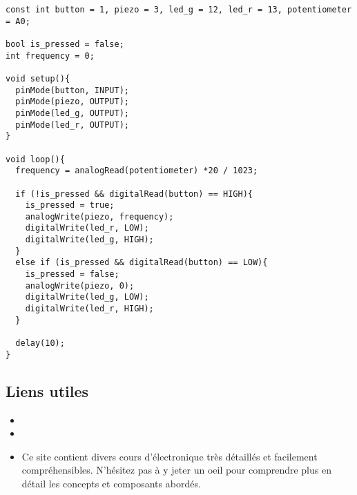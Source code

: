 \begin{tcolorbox}[colback=yellow-atelier!10, colframe=gray!70!black, coltitle=black, colbacktitle=gray!70!white, title={\textit{Bientôt DJ ?}}, leftrule=2mm]
\begin{small}
\begin{verbatim}
const int button = 1, piezo = 3, led_g = 12, led_r = 13, potentiometer = A0;

bool is_pressed = false;
int frequency = 0;

void setup(){
  pinMode(button, INPUT);
  pinMode(piezo, OUTPUT);
  pinMode(led_g, OUTPUT);
  pinMode(led_r, OUTPUT);
}

void loop(){
  frequency = analogRead(potentiometer) *20 / 1023;
  
  if (!is_pressed && digitalRead(button) == HIGH){
    is_pressed = true;
  	analogWrite(piezo, frequency);
    digitalWrite(led_r, LOW);
    digitalWrite(led_g, HIGH);
  }
  else if (is_pressed && digitalRead(button) == LOW){
    is_pressed = false;
  	analogWrite(piezo, 0);
    digitalWrite(led_g, LOW);
    digitalWrite(led_r, HIGH);
  }
  
  delay(10);
}
\end{verbatim}
\end{small}
\end{tcolorbox}

\clearpage
\subsection{Liens utiles}

\begin{itemize}
	\item {}
	\item {}
	\item {}
		  Ce site contient divers cours d'électronique très détaillés et facilement compréhensibles.
		  N'hésitez pas à y jeter un oeil pour comprendre plus en détail les concepts et composants abordés.
\end{itemize}